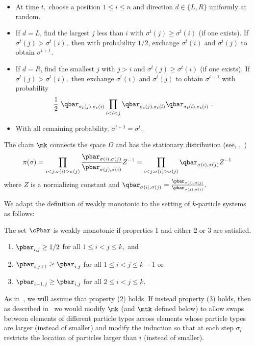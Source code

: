 \documentclass{toc}
\begin{document}
\vspace{.1in}

\vspace{.05in}
\begin{itemize}
\item At time $t,$ choose a position $1\leq i \leq n$ and direction 
$d \in \{L, R\}$ uniformly at random.  
\item If $d = L$, find the largest $j$ less than $i$ with $\sigma^t(j) \geq \sigma^t(i)$ (if one exists).  If $\sigma^t(j) > \sigma^t(i),$ then 
with probability $1/2$,
exchange $\sigma^t(i)$ and $\sigma^t(j)$ to obtain $\sigma^{t+1}.$  
\item If $d = R$, find the smallest $j$ with  $j>i$ and $\sigma^t(j) \geq \sigma^t(i)$ (if one exists).  If $\sigma^t(j) > \sigma^t(i),$ then exchange $\sigma^t(i)$ and $\sigma^t(j)$ to obtain $\sigma^{t+1}$ with probability 
$$\frac{1}{2}~ \qbar_{\sigma_t(j),\sigma_t(i)}  \prod_{i<l<j} \qbar_{\sigma_t(j),\sigma_t(l)}\qbar_{\sigma_t(l),\sigma_t(i)}\,\,.$$


\item With all remaining probability, $\sigma^{t+1} = \sigma^t$.
\end{itemize}

\noindent The chain $\mk$  connects the space $\Omega$ and has the stationary distribution (see, \eg,~\cite{bmrs})
$$\pi(\sigma) = \prod_{i < j: \sigma(i) > \sigma(j)}\frac{\pbar_{\sigma(i),\sigma(j)}}{\pbar_{\sigma(j),\sigma(i)}} Z^{-1} = \prod_{i < j: \sigma(i) > \sigma(j)}\qbar_{\sigma(i), \sigma(j)} Z^{-1} $$ where $Z$ is a normalizing constant and $\qbar_{\sigma(i), \sigma(j)}=\frac{\pbar_{\sigma(i),\sigma(j)}}{\pbar_{\sigma(j),\sigma(i)}}.$  

We adapt the definition of weakly monotonic to the setting of $k$-particle systems as follows:
 
\begin{definition}\label{mono}The set $\cPbar$ is weakly monotonic if properties 1 and either 2 or 3 are satisfied.
\begin{enumerate}
\item $\pbar_{i,j} \geq 1/2$ for all $1 \leq i < j \leq k,$ and
\item $\pbar_{i,j+1} \geq \pbar_{i,j}$ for all $1 \leq i < j \leq k-1$ or
\item $\pbar_{i-1,j} \geq \pbar_{i,j}$ for all $2 \leq i < j \leq k.$
\end{enumerate}
\end{definition}
\noindent As in~\cite{MS}, we will assume that property (2) holds.  If
instead property (3) holds, then as described in~\cite{MS} we would
modify $\mk$ (and $\mtk$ defined below) to allow swaps between
elements of different particle types across elements whose particle
types are larger (instead of smaller) and modify the induction so
that at each step $\sigma_{i}$ restricts the location of particles
larger than $i$ (instead of smaller).
\end{document}
